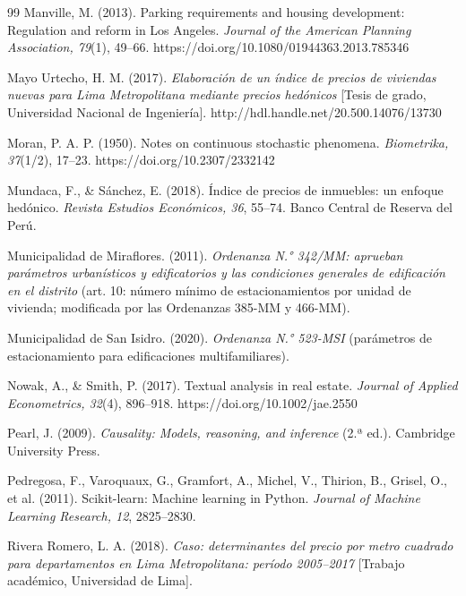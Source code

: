 \begin{thebibliography}{99}
Manville, M. (2013). Parking requirements and housing development: Regulation and reform in Los Angeles. \textit{Journal of the American Planning Association, 79}(1), 49--66. https://doi.org/10.1080/01944363.2013.785346

Mayo Urtecho, H. M. (2017). \textit{Elaboración de un índice de precios de viviendas nuevas para Lima Metropolitana mediante precios hedónicos} [Tesis de grado, Universidad Nacional de Ingeniería]. http://hdl.handle.net/20.500.14076/13730

Moran, P. A. P. (1950). Notes on continuous stochastic phenomena. \textit{Biometrika, 37}(1/2), 17--23. https://doi.org/10.2307/2332142

Mundaca, F., \& Sánchez, E. (2018). Índice de precios de inmuebles: un enfoque hedónico. \textit{Revista Estudios Económicos, 36}, 55--74. Banco Central de Reserva del Perú.

Municipalidad de Miraflores. (2011). \textit{Ordenanza N.° 342/MM: aprueban parámetros urbanísticos y edificatorios y las condiciones generales de edificación en el distrito} (art. 10: número mínimo de estacionamientos por unidad de vivienda; modificada por las Ordenanzas 385-MM y 466-MM).

Municipalidad de San Isidro. (2020). \textit{Ordenanza N.° 523-MSI} (parámetros de estacionamiento para edificaciones multifamiliares).

Nowak, A., \& Smith, P. (2017). Textual analysis in real estate. \textit{Journal of Applied Econometrics, 32}(4), 896--918. https://doi.org/10.1002/jae.2550

Pearl, J. (2009). \textit{Causality: Models, reasoning, and inference} (2.ª ed.). Cambridge University Press.

Pedregosa, F., Varoquaux, G., Gramfort, A., Michel, V., Thirion, B., Grisel, O., et al. (2011). Scikit-learn: Machine learning in Python. \textit{Journal of Machine Learning Research, 12}, 2825--2830.

Rivera Romero, L. A. (2018). \textit{Caso: determinantes del precio por metro cuadrado para departamentos en Lima Metropolitana: período 2005--2017} [Trabajo académico, Universidad de Lima].


\end{thebibliography}
